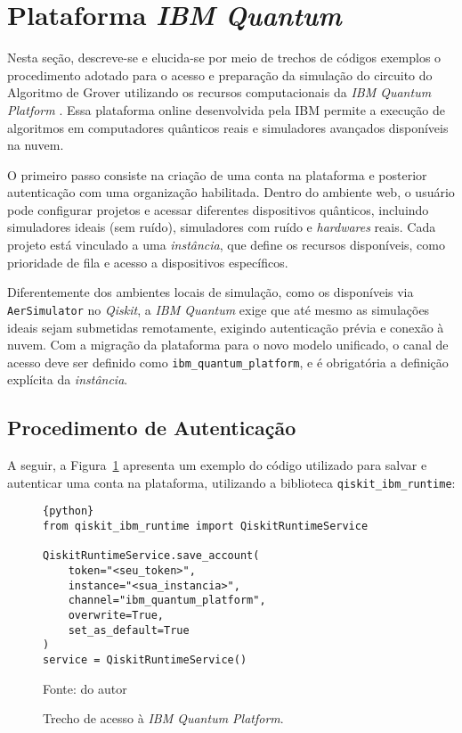 \section{Plataforma \textit{IBM Quantum}}
\label{sec: plataformaIBM}

Nesta seção, descreve-se e elucida-se por meio de trechos de códigos exemplos o procedimento adotado para o acesso e preparação da simulação do circuito do Algoritmo de Grover utilizando os recursos computacionais da \textit{IBM Quantum Platform} \cite{IBM_quantum}. Essa plataforma online desenvolvida pela IBM permite a execução de algoritmos em computadores quânticos reais e simuladores avançados disponíveis na nuvem.

O primeiro passo consiste na criação de uma conta na plataforma e posterior autenticação com uma organização habilitada. Dentro do ambiente web, o usuário pode configurar projetos e acessar diferentes dispositivos quânticos, incluindo simuladores ideais (sem ruído), simuladores com ruído e \textit{hardwares} reais. Cada projeto está vinculado a uma \textit{instância}, que define os recursos disponíveis, como prioridade de fila e acesso a dispositivos específicos.

Diferentemente dos ambientes locais de simulação, como os disponíveis via \texttt{AerSimulator} no \textit{Qiskit}, a \textit{IBM Quantum} exige que até mesmo as simulações ideais sejam submetidas remotamente, exigindo autenticação prévia e conexão à nuvem. Com a migração da plataforma para o novo modelo unificado, o canal de acesso deve ser definido como \verb|ibm_quantum_platform|, e é obrigatória a definição explícita da \textit{instância}.

\subsection{Procedimento de Autenticação}
\label{subSec: auth}

A seguir, a Figura~\ref{cod:acessaIBM} apresenta um exemplo do código utilizado para salvar e autenticar uma conta na plataforma, utilizando a biblioteca \verb|qiskit_ibm_runtime|:

\begin{figure}[!htb]
\centering
\caption{Trecho de acesso à \textit{IBM Quantum Platform}.} 
\begin{lstlisting}{python}
from qiskit_ibm_runtime import QiskitRuntimeService

QiskitRuntimeService.save_account(
    token="<seu_token>",
    instance="<sua_instancia>",
    channel="ibm_quantum_platform",
    overwrite=True,
    set_as_default=True
)
service = QiskitRuntimeService()
\end{lstlisting} 
{\small Fonte: do autor} 
\label{cod:acessaIBM} 
\end{figure}

